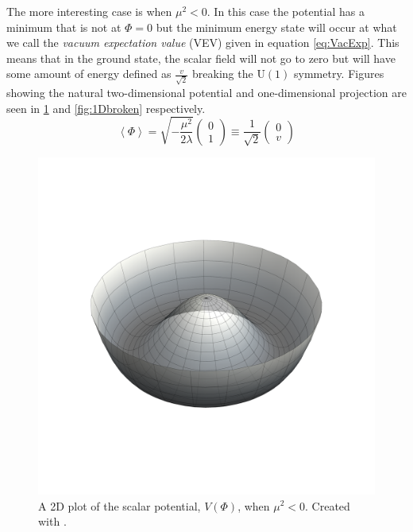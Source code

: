 The more interesting case is when $\mu^2 < 0$. In this case the potential has a minimum that is not at $\Phi = 0$ but the minimum energy state will occur at what we call the \textit{vacuum expectation value} (VEV) given in equation \ref{eq:VacExp}. This means that in the ground state, the scalar field will not go to zero but will have some amount of energy defined as $\frac{v}{\sqrt{2}}$ breaking the $\mathrm{U}(1)$ symmetry. Figures showing the natural two-dimensional potential and one-dimensional projection are seen in \ref{fig:2Dbroken} and \ref{fig:1Dbroken} respectively. 
\begin{equation}
\label{eq:VacExp}
\left<\Phi\right> = \sqrt{-\frac{\mu^2}{2\lambda}} \begin{pmatrix} 0 \\ 1 \end{pmatrix} \equiv \frac{1}{\sqrt{2}} \begin{pmatrix} 0 \\ v \end{pmatrix}
\end{equation}

\begin{figure}
\begin{center}
\includegraphics[width=0.75\linewidth]{Introduction/Mexican_Hat.pdf}
\caption{A 2D plot of the scalar potential, $V\left(\Phi\right)$, when $\mu^2 < 0$. Created with \cite{Mathematica10_1}.}
\label{fig:2Dbroken}
\end{center}
\end{figure}

